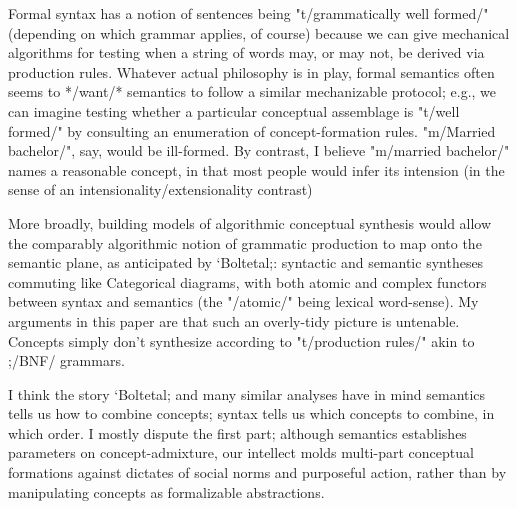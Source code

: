 Formal syntax has a notion of sentences being "t/grammatically well formed/" 
(depending on which grammar applies, of course) because we can give 
mechanical algorithms for testing when a string of words may, or may not, 
be derived via production rules.  Whatever actual philosophy is in play, 
formal semantics often seems to */want/* semantics to follow a 
similar mechanizable protocol; e.g., we can imagine testing whether a 
particular conceptual assemblage is "t/well formed/" by 
consulting an enumeration of concept-formation rules.   
"m/Married bachelor/", say, would be ill-formed.  By contrast,  
I believe "m/married bachelor/" names a reasonable concept, in  
that most people would infer its intension (in the sense of an 
intensionality/extensionality contrast) %

More broadly, building 
models of algorithmic conceptual synthesis would allow the comparably 
algorithmic notion of grammatic production to map onto the semantic 
plane, as anticipated by `Boltetal;: syntactic and semantic syntheses 
commuting like Categorical diagrams, with both atomic and complex functors 
between syntax and semantics (the "/atomic/" being lexical word-sense).  
My arguments in this paper are that such an overly-tidy picture is 
untenable.  Concepts simply don't synthesize according to 
"t/production rules/" akin to ;/BNF/ grammars.  

I think the story `Boltetal; and many similar analyses have 
in mind %
semantics tells us how to combine concepts; 
syntax tells us which concepts to combine, in which 
order.  I mostly dispute the first part; although 
semantics establishes parameters on concept-admixture, 
our intellect molds multi-part 
conceptual formations against dictates 
of social norms and purposeful action, rather than 
by manipulating concepts as formalizable abstractions.

